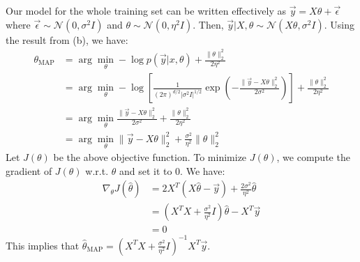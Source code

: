 \begin{answer}
Our model for the whole training set can be written effectively as $\vec{y} = X\theta + \vec{\epsilon}$ where $ \vec{\epsilon} \sim \mathcal{N}(0,\sigma^2 I) $ and $ \theta \sim \mathcal{N}(0,\eta^2 I) $. Then, $\vec{y}|X,\theta \sim \mathcal{N}(X\theta,\sigma^2 I)$. Using the result from (b), we have:
\begin{align}
	\theta_{\text{MAP}}
	&= \arg\min_{\theta} -\log p(\vec{y}|x,\theta) + \frac{\|\theta\|_2^2}{2\eta^2} \\
	&= \arg\min_{\theta} -\log \left[ \frac{1}{(2\pi)^{d/2}|\sigma^2 I|^{1/2}} \exp \left( -\frac{\|\vec{y} - X\theta\|_2^2}{2\sigma^2} \right) \right] + \frac{\|\theta\|_2^2}{2\eta^2} \\
	&= \arg\min_{\theta} \frac{\|\vec{y} - X\theta\|_2^2}{2\sigma^2} + \frac{\|\theta\|_2^2}{2\eta^2} \\
	&= \arg\min_{\theta} \|\vec{y} - X\theta\|_2^2 + \frac{\sigma^2}{\eta^2} \|\theta\|^2_2
\end{align}
Let $J(\theta)$ be the above objective function. To minimize $J(\theta)$, we compute the gradient of $J(\theta)$ w.r.t. $\theta$ and set it to 0. We have:
\begin{align}
	\nabla_{\theta}J(\hat\theta) 
	&= 2X^T(X\hat\theta - \vec{y}) + \frac{2\sigma^2}{\eta^2} \hat\theta \\
	&= \left( X^TX + \frac{\sigma^2}{\eta^2} I \right) \hat\theta - X^T \vec{y} \\
	&= 0
\end{align}
This implies that $\hat\theta_{\text{MAP}} = \left( X^TX + \frac{\sigma^2}{\eta^2} I \right)^{-1} X^T \vec{y}$. \\
\end{answer}
